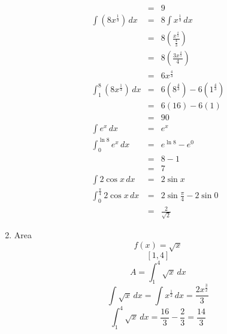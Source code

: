 \documentclass{article}
\begin{document}
\begin{enumerate}
\begin{eqnarray}
                                                     &=& 9 \\
            \int{\left(8x^{\frac{1}{3}}\right)\,dx} &=& 8\int{x^{\frac{1}{3}}\,dx} \\
                                                    &=& 8\left(\frac{x^{\frac{4}{3}}}{\frac{4}{3}}\right) \\
                                                    &=& 8\left(\frac{3x^{\frac{4}{3}}}{4}\right) \\
                                                    &=& 6x^{\frac{4}{3}} \\
            \int_1^8{\left(8x^{\frac{1}{3}}\right)\,dx} &=& 6\left(8^{\frac{4}{3}}\right) - 6\left(1^{\frac{4}{3}}\right) \\
                                                        &=& 6(16) - 6(1) \\
                                                        &=& 90 \\
            \int{e^x\,dx} &=& e^x \\
            \int_0^{\ln{8}}{e^x\,dx} &=& e^{\ln{8}} - e^0 \\
                                     &=& 8 - 1 \\
                                     &=& 7 \\
            \int{2\cos{x}\,dx} &=& 2\sin{x} \\
            \int_0^{\frac{\pi}{4}}{2\cos{x}\,dx} &=& 2\sin{\frac{\pi}{4}} - 2\sin{0} \\
                                                 &=& \frac{2}{\sqrt{2}}
        \end{eqnarray}
    \item Area
        $$f(x) = \sqrt{x}$$
        $$[1,4]$$
        $$A = \int_1^4{\sqrt{x}\,dx}$$
        $$\int{\sqrt{x}\,dx} = \int{x^{\frac{1}{2}}\,dx} = \frac{2x^{\frac{3}{2}}}{3}$$
        $$\int_1^4{\sqrt{x}\,dx} = \frac{16}{3} - \frac{2}{3} = \frac{14}{3}$$
\end{enumerate}
\end{document}
